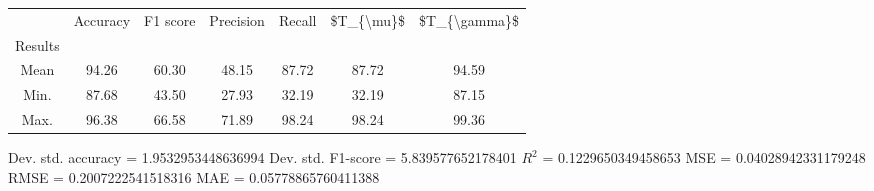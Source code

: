 \begin{tabular}{|c|c|c|c|c|c|c|}
\toprule
{} &  Accuracy &  F1 score &  Precision &  Recall &  \$T\_\{\textbackslash mu\}\$ &  \$T\_\{\textbackslash gamma\}\$ \\
Results &           &           &            &         &            &               \\
\hline
Mean    &     94.26 &     60.30 &      48.15 &   87.72 &      87.72 &         94.59 \\
Min.    &     87.68 &     43.50 &      27.93 &   32.19 &      32.19 &         87.15 \\
Max.    &     96.38 &     66.58 &      71.89 &   98.24 &      98.24 &         99.36 \\
\bottomrule
\end{tabular}

 Dev. std. accuracy = 1.9532953448636994
 Dev. std. F1-score = 5.839577652178401
 $R^2$ = 0.1229650349458653
 MSE = 0.04028942331179248
 RMSE = 0.2007222541518316
 MAE = 0.05778865760411388